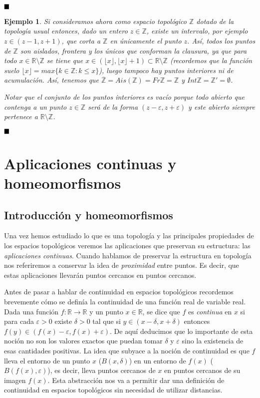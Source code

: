 \documentclass[12pt]{article}
\newtheorem{example}{Ejemplo}[theorem]
\begin{document}
$\hfill \blacksquare$

\begin{example}Si consideramos ahora como espacio topológico $\mathbb{Z}$ dotado de la topología usual entonces, dado un entero $z \in \mathbb{Z}$, existe un intervalo, por ejemplo $z \in (z-1, z+1)$, que corta a $\mathbb{Z}$ en únicamente el punto $z$. Así, todos los puntos de $\mathbb{Z}$ son aislados, frontera y los únicos que conforman la clausura, ya que para todo $x \in \mathbb{R}\setminus \mathbb{Z}$ se tiene que $x \in (\lfloor x \rfloor, \lfloor x \rfloor + 1) \subset \mathbb{R} \setminus \mathbb{Z}$ (recordemos que la función suelo $\lfloor x \rfloor = max\lbrace k \in \mathbb{Z}: k\leq x \rbrace$), luego tampoco hay puntos interiores ni de acumulación. Así, tenemos que $\overline{\mathbb{Z}} = Ais (\mathbb{Z}) = Fr\mathbb{Z} = \mathbb{Z}$ y $Int\mathbb{Z} = \mathbb{Z}' = \emptyset$.

Notar que el conjunto de los puntos interiores es vacío porque todo abierto que contenga a un punto $z \in \mathbb{Z}$ será de la forma $(z-\varepsilon, z+\varepsilon)$ y este abierto siempre pertenece a $\mathbb{R}\setminus \mathbb{Z}$.
\end{example}

$\hfill \blacksquare$

\section{Aplicaciones continuas y homeomorfismos}

\subsection{Introducción y homeomorfismos}

Una vez hemos estudiado lo que es una topología y las principales propiedades de los espacios topológicos veremos las aplicaciones que preservan su estructura: las \textit{aplicaciones continuas}. Cuando hablamos de preservar la estructura en topología nos referiremos a conservar la idea de \textit{proximidad} entre puntos. Es decir, que estas aplicaciones llevarán puntos cercanos en puntos cercanos. 

Antes de pasar a hablar de continuidad en espacios topológicos recordemos brevemente cómo se definía la continuidad de una función real de variable real. Dada una función $f \colon \mathbb{R} \longrightarrow \mathbb{R}$ y un punto $x \in \mathbb{R}$, se dice que $f$ es \textit{continua} en $x$ si para cada $\varepsilon >0$ existe $\delta >0$ tal que si $y \in (x- \delta, x + \delta)$ entonces $f(y) \in (f(x)-\varepsilon, f(x) + \varepsilon)$. De aquí deducimos que lo importante de esta noción no son los valores exactos que puedan tomar $\delta$ y $\varepsilon$ sino la existencia de esas cantidades positivas. La idea que subyace a la noción de continuidad es que $f$ lleva el entorno de un punto $x$ ($B(x, \delta)$) en un entorno de $f(x)$ ($B(f(x), \varepsilon)$), es decir, lleva puntos cercanos de $x$ en puntos cercanos de su imagen $f(x)$. Esta abstracción nos va a permitir dar una definición de continuidad en espacios topológicos sin necesidad de utilizar distancias.
\end{document}
